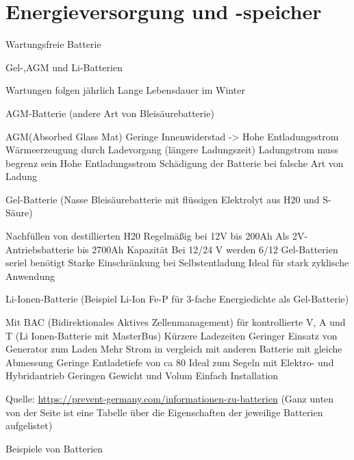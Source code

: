\chapter{Energieversorgung und -speicher}

Wartungsfreie Batterie

Gel-,AGM und Li-Batterien

Wartungen folgen jährlich
Lange Lebensdauer im Winter


AGM-Batterie (andere Art von Bleisäurebatterie)

AGM(Absorbed Glass Mat)
Geringe Innenwiderstad -> Hohe Entladungsstrom
Wärmeerzeugung durch Ladevorgang (längere Ladungszeit)
Ladungstrom muss begrenz sein
Hohe Entladungsstrom
Schädigung der Batterie bei falsche Art von Ladung


Gel-Batterie (Nasse Bleisäurebatterie mit flüssigen Elektrolyt aus H20 und S-Säure)

Nachfüllen von destillierten H20
Regelmäßig bei 12V bis 200Ah
Als 2V-Antriebsbatterie bis 2700Ah Kapazität
Bei 12/24 V werden 6/12 Gel-Batterien seriel benötigt
Starke Einschränkung bei Selbstentladung
Ideal für stark zyklische Anwendung


Li-Ionen-Batterie (Beispiel Li-Ion Fe-P für 3-fache Energiedichte als Gel-Batterie)

Mit BAC (Bidirektionales Aktives Zellenmanagement) für kontrollierte V, A und T
(Li Ionen-Batterie mit MasterBus)
Kürzere Ladezeiten
Geringer Einsatz von Generator zum Laden
Mehr Strom in vergleich mit anderen Batterie mit gleiche Abmessung
Geringe Entladetiefe von ca 80%
Ideal zum Segeln mit Elektro- und Hybridantrieb
Geringen Gewicht und Volum
Einfach Installation

Quelle: \url{https://prevent-germany.com/informationen-zu-batterien}
(Ganz unten von der Seite ist eine Tabelle über die Eigenschaften der jeweilige Batterien aufgelistet)

Beispiele von Batterien

